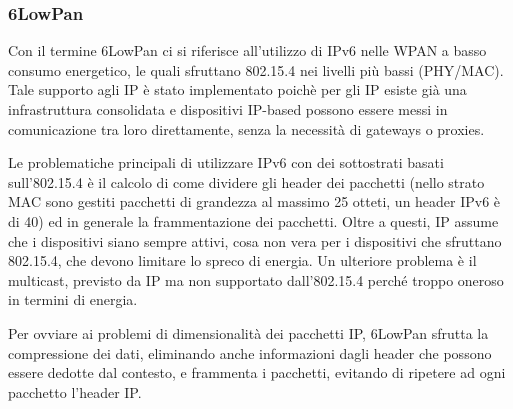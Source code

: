 \subsubsection{6LowPan}
Con il termine 6LowPan ci si riferisce all'utilizzo di IPv6 nelle WPAN a basso
consumo energetico, le quali sfruttano 802.15.4 nei livelli più bassi (PHY/MAC).
Tale supporto agli IP è stato implementato poichè per gli IP esiste già una
infrastruttura consolidata e dispositivi IP-based possono essere messi in
comunicazione tra loro direttamente, senza la necessità di gateways o proxies.

Le problematiche principali di utilizzare IPv6 con dei sottostrati basati
sull'802.15.4 è il calcolo di come dividere gli header dei pacchetti (nello
strato MAC sono gestiti pacchetti di grandezza al massimo 25 otteti, un header
IPv6 è di 40) ed in generale la frammentazione dei pacchetti. Oltre a questi, IP
assume che i dispositivi siano sempre attivi, cosa non vera per i dispositivi
che sfruttano 802.15.4, che devono limitare lo spreco di energia. Un ulteriore
problema è il multicast, previsto da IP ma non supportato dall'802.15.4 perché
troppo oneroso in termini di energia.

Per ovviare ai problemi di dimensionalità dei pacchetti IP, 6LowPan sfrutta la
compressione dei dati, eliminando anche informazioni dagli header che possono
essere dedotte dal contesto, e frammenta i pacchetti, evitando di ripetere ad
ogni pacchetto l'header IP.
